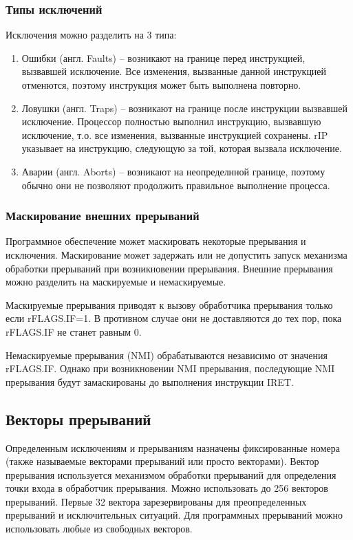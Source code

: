 \subsubsection*{Типы исключений}
Исключения можно разделить на 3 типа:
\begin{enumerate}[1.]
\item Ошибки (англ. Faults) -- возникают на границе перед
инструкцией, вызвавшей исключение. Все изменения, вызванные данной инструкцией
отменются, поэтому инструкция может быть выполнена повторно.
\item Ловушки (англ. Traps) -- возникают на границе после
инструкции вызвавшей исключение. Процессор полностью выполнил инструкцию,
вызвавшую исключение, т.о. все изменения, вызванные инструкцией сохранены.
rIP указывает на инструкцию, следующую за той, которая вызвала исключение.
\item Аварии (англ. Aborts) -- возникают на неопределнной границе,
поэтому обычно они не позволяют продолжить правильное выполнение процесса.
\end{enumerate}

\subsubsection*{Маскирование внешних прерываний}
Программное обеспечение может маскировать некоторые прерывания и исключения.
Маскирование может задержать или не допустить запуск механизма обработки
прерываний при возникновении прерывания. Внешние прерывания можно разделить на
маскируемые и немаскируемые.

Маскируемые прерывания приводят к вызову обработчика прерывания только если
rFLAGS.IF=1. В противном случае они не доставляются до тех пор, пока rFLAGS.IF
не станет равным 0.

Немаскируемые прерывания (NMI) обрабатываются независимо от значения rFLAGS.IF.
Однако при возникновении NMI прерывания, последующие NMI прерывания будут
замаскированы до выполнения инструкции IRET.

\subsection{Векторы прерываний}
Определенным исключениям и прерываниям назначены фиксированные номера (также
называемые векторами прерываний или просто векторами). Вектор прерывания
используется механизмом обработки прерываний для определения точки входа в
обработчик прерывания. Можно использовать до 256 векторов прерываний. Первые 32 вектора
зарезервированы для преопределенных прерываний и исключительных ситуаций.
Для программных прерываний можно использовать любые из свободных векторов.

